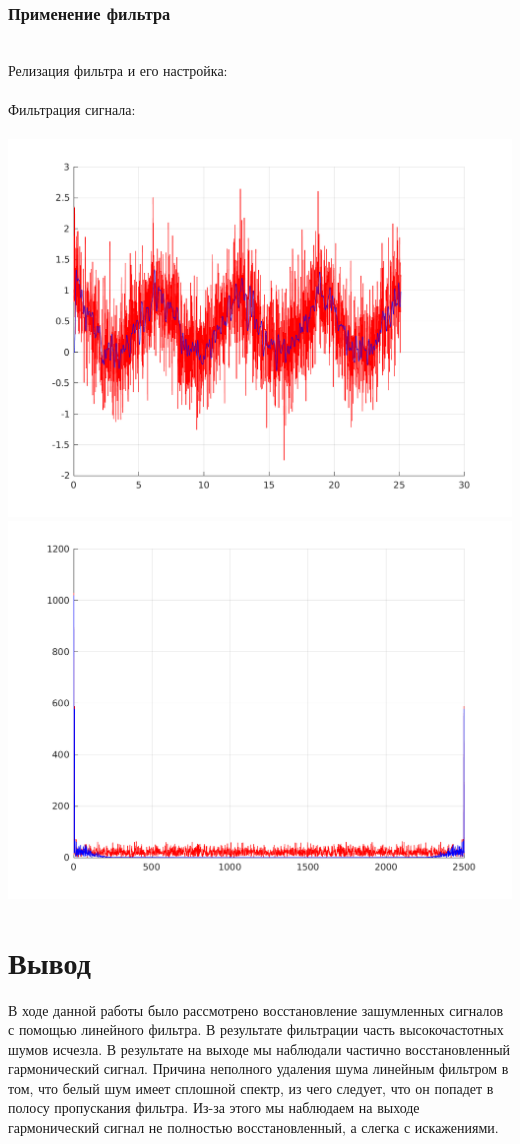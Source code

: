 \documentclass[a4paper]{article}
\begin{document}
\subsubsection{Применение фильтра}\\
Релизация фильтра и его настройка:\\
\newpage
\\
Фильтрация сигнала:\\
\\
\includegraphics[scale=0.7]{lab3/figures/figure_16.png}\\
\includegraphics[scale=0.7]{lab3/figures/figure_17.png}\\
\section{Вывод}
В ходе данной работы было рассмотрено восстановление зашумленных сигналов с помощью линейного фильтра. В результате фильтрации часть высокочастотных шумов исчезла. В результате на выходе мы наблюдали частично восстановленный гармонический сигнал.
Причина неполного удаления шума линейным фильтром в том, что белый шум имеет сплошной спектр, из чего следует, что он попадет в полосу пропускания фильтра. Из-за этого мы наблюдаем на выходе гармонический сигнал не полностью восстановленный, а слегка с искажениями.
\end{document}
